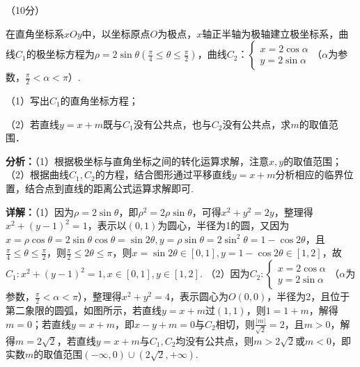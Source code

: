 \begin{question}[points=10]
[选修4-4]（10分）

在直角坐标系$xOy$中，以坐标原点$O$为极点，$x$轴正半轴为极轴建立极坐标系，曲线$C_1$的极坐标方程为$\rho=2\sin\theta \left(\frac{\pi}{4}\le\theta\le\frac{\pi}{2}\right)$，曲线$C_2$：$\begin{cases}x=2\cos\alpha\\y=2\sin\alpha\end{cases}$（$\alpha$为参数，$\frac{\pi}{2}<\alpha<\pi$）.

（1）写出$C_1$的直角坐标方程；

（2）若直线$y=x+m$既与$C_1$没有公共点，也与$C_2$没有公共点，求$m$的取值范围．
\begin{solution}

\textbf{分析：}（1）根据极坐标与直角坐标之间的转化运算求解，注意$x,y$的取值范围；
（2）根据曲线$C_1, C_2$的方程，结合图形通过平移直线$y=x+m$分析相应的临界位置，结合点到直线的距离公式运算求解即可.

\textbf{详解：}（1）因为$\rho=2\sin\theta$，即$\rho^2=2\rho\sin\theta$，可得$x^2+y^2=2y$，整理得$x^2+(y-1)^2=1$，表示以$(0,1)$为圆心，半径为1的圆，又因为$x=\rho\cos\theta=2\sin\theta\cos\theta=\sin2\theta, y=\rho\sin\theta=2\sin^2\theta=1-\cos2\theta$，且$\frac{\pi}{4}\le\theta\le\frac{\pi}{2}$，则$\frac{\pi}{2}\le2\theta\le\pi$，则$x=\sin2\theta\in[0,1], y=1-\cos2\theta\in[1,2]$，故$C_1: x^2+(y-1)^2=1, x\in[0,1], y\in[1,2]$.
（2）因为$C_2: \begin{cases}x=2\cos\alpha\\y=2\sin\alpha\end{cases}$（$\alpha$为参数，$\frac{\pi}{2}<\alpha<\pi$），整理得$x^2+y^2=4$，表示圆心为$O(0,0)$，半径为2，且位于第二象限的圆弧，如图所示，若直线$y=x+m$过$(1,1)$，则$1=1+m$，解得$m=0$；若直线$y=x+m$，即$x-y+m=0$与$C_2$相切，则$\frac{|m|}{\sqrt{2}}=2$，且$m>0$，解得$m=2\sqrt{2}$，若直线$y=x+m$与$C_1, C_2$均没有公共点，则$m>2\sqrt{2}$或$m<0$，即实数$m$的取值范围$(-\infty,0)\cup(2\sqrt{2},+\infty)$.
\end{solution}
\end{question}


